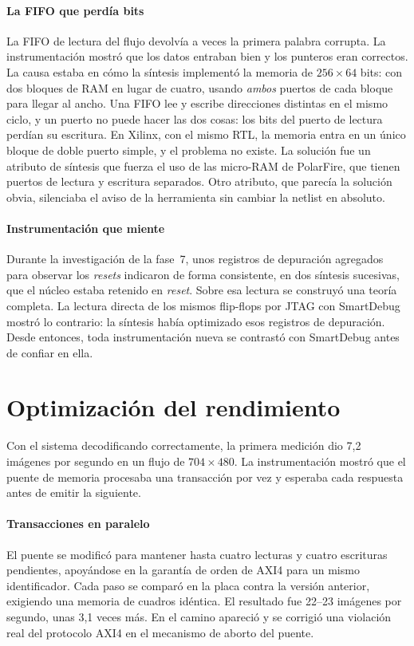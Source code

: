 \paragraph{La FIFO que perdía bits}
\label{sec:prob-fifo}
La FIFO de lectura del flujo devolvía a veces la primera palabra corrupta. La
instrumentación mostró que los datos entraban bien y los punteros eran
correctos. La causa estaba en cómo la síntesis implementó la memoria de
$256 \times 64$ bits: con dos bloques de RAM en lugar de cuatro, usando
\emph{ambos} puertos de cada bloque para llegar al ancho. Una FIFO lee y
escribe direcciones distintas en el mismo ciclo, y un puerto no puede hacer
las dos cosas: los bits del puerto de lectura perdían su escritura. En Xilinx,
con el mismo RTL, la memoria entra en un único bloque de doble puerto
simple, y el problema no existe. La solución fue un atributo de síntesis que
fuerza el uso de las micro-RAM de PolarFire, que tienen puertos de lectura y
escritura separados. Otro atributo, que parecía la solución obvia, silenciaba
el aviso de la herramienta sin cambiar la netlist en absoluto.

\paragraph{Instrumentación que miente}
Durante la investigación de la fase~7, unos registros de depuración
agregados para observar los \emph{resets} indicaron de forma consistente,
en dos síntesis sucesivas, que el núcleo estaba retenido en \emph{reset}.
Sobre esa lectura se construyó una teoría completa. La lectura directa de
los mismos flip-flops por JTAG con SmartDebug mostró lo contrario: la
síntesis había optimizado esos registros de depuración. Desde entonces, toda
instrumentación nueva se contrastó con SmartDebug antes de confiar en ella.

\section{Optimización del rendimiento}
\label{sec:optimizacion}

Con el sistema decodificando correctamente, la primera medición dio
7,2 imágenes por segundo en un flujo de $704 \times 480$. La
instrumentación mostró que el puente de memoria procesaba una transacción
por vez y esperaba cada respuesta antes de emitir la siguiente.

\paragraph{Transacciones en paralelo}
El puente se modificó para mantener hasta cuatro lecturas y cuatro
escrituras pendientes, apoyándose en la garantía de orden de AXI4 para un
mismo identificador. Cada paso se comparó en la placa contra la versión
anterior, exigiendo una memoria de cuadros idéntica. El resultado fue
22--23 imágenes por segundo, unas 3,1 veces más. En el
camino apareció y se corrigió una violación real del protocolo AXI4 en el
mecanismo de aborto del puente.

